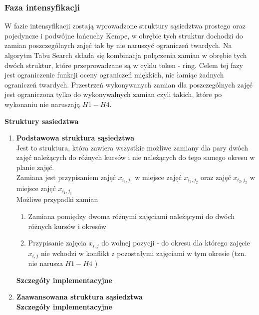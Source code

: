 \documentclass[11pt]{report}
\begin{document}
\subsubsection{Faza intensyfikacji}
\par W fazie intensyfikacji zostają wprowadzone struktury sąsiedztwa prostego oraz pojedyncze i podwójne łańcuchy Kempe, w obrębie tych struktur dochodzi do zamian poszczególnych zajęć tak by nie naruszyć ograniczeń twardych. Na algorytm Tabu Search składa się kombinacja połączenia zamian w obrębie tych dwóch struktur, które przeprowadzane są w cyklu token - ring. Celem tej fazy jest ograniczenie funkcji oceny ograniczeń miękkich, nie łamiąc żadnych ograniczeń twardych. Przestrzeń wykonywanych zamian dla poszczególnych zajęć jest ograniczona tylko do wykonywalnych zamian czyli takich, które po wykonaniu nie naruszają ${H1-H4}$.
\par \textbf{Struktury sasiedztwa}
\begin{enumerate}
\item \textbf{Podstawowa struktura sąsiedztwa} \\
Jest to struktura, która zawiera wszystkie możliwe zamiany dla pary dwóch zajęć należących do różnych kursów i nie należących do tego samego okresu w planie zajęć. \\
Zamiana jest przypisaniem zajęć $x_{i_{1},j_{1}}$ w miejsce zajęć ${x_{i_{2}, j_{2}}}$ oraz zajęć ${x_{i_{2}, j_{2}}}$ w miejsce zajęć $x_{i_{1},j_{1}}$ \\
Możliwe przypadki zamian
\begin{enumerate}
\item Zamiana pomiędzy dwoma różnymi zajęciami należącymi do dwóch różnych kursów i okresów
\item Przypisanie zajęcia ${x_{i,j}}$ do wolnej pozycji - do okresu dla którego zajęcie ${x_{i,j}}$ nie wchodzi w konflikt z pozostałymi zajęciami w tym okresie (tzn. nie narusza ${H1-H4}$ )
\end{enumerate}
\textbf{Szczegóły implementacyjne}

\item \textbf{Zaawansowana struktura sąsiedztwa} \\
\textbf{Szczegóły implementacyjne}
\end{enumerate}
\end{document}
